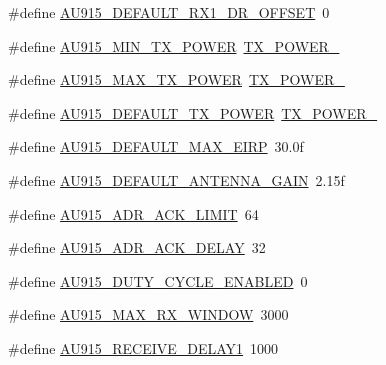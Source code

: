 \begin{DoxyCompactItemize}
\item 
\#define \mbox{\hyperlink{group___r_e_g_i_o_n_a_u915_gad91be65b45ba7c349d42b1e564c65251}{A\+U915\+\_\+\+D\+E\+F\+A\+U\+L\+T\+\_\+\+R\+X1\+\_\+\+D\+R\+\_\+\+O\+F\+F\+S\+ET}}~0
\item 
\#define \mbox{\hyperlink{group___r_e_g_i_o_n_a_u915_gabd0f5ea8e2143d42b1e480305bb2fd5d}{A\+U915\+\_\+\+M\+I\+N\+\_\+\+T\+X\+\_\+\+P\+O\+W\+ER}}~\mbox{\hyperlink{group___r_e_g_i_o_n_gac9747c69350f34d485c3134e5a57655b}{T\+X\+\_\+\+P\+O\+W\+E\+R\+\_}}
\item 
\#define \mbox{\hyperlink{group___r_e_g_i_o_n_a_u915_ga36808f695e52582b8a6a3ca4b4bf61d4}{A\+U915\+\_\+\+M\+A\+X\+\_\+\+T\+X\+\_\+\+P\+O\+W\+ER}}~\mbox{\hyperlink{group___r_e_g_i_o_n_gab33618449f2a573142c463ab071ef8ed}{T\+X\+\_\+\+P\+O\+W\+E\+R\+\_}}
\item 
\#define \mbox{\hyperlink{group___r_e_g_i_o_n_a_u915_ga8f8d247b742aea5399eabca9b978121f}{A\+U915\+\_\+\+D\+E\+F\+A\+U\+L\+T\+\_\+\+T\+X\+\_\+\+P\+O\+W\+ER}}~\mbox{\hyperlink{group___r_e_g_i_o_n_gab33618449f2a573142c463ab071ef8ed}{T\+X\+\_\+\+P\+O\+W\+E\+R\+\_}}
\item 
\#define \mbox{\hyperlink{group___r_e_g_i_o_n_a_u915_gac1d0807c3b28e1f1e1c7f574e66ba158}{A\+U915\+\_\+\+D\+E\+F\+A\+U\+L\+T\+\_\+\+M\+A\+X\+\_\+\+E\+I\+RP}}~30.\+0f
\item 
\#define \mbox{\hyperlink{group___r_e_g_i_o_n_a_u915_ga3184a1e4e099ac04b86c390a012845a7}{A\+U915\+\_\+\+D\+E\+F\+A\+U\+L\+T\+\_\+\+A\+N\+T\+E\+N\+N\+A\+\_\+\+G\+A\+IN}}~2.\+15f
\item 
\#define \mbox{\hyperlink{group___r_e_g_i_o_n_a_u915_gab5782862067a1d6338da8372a9d484c6}{A\+U915\+\_\+\+A\+D\+R\+\_\+\+A\+C\+K\+\_\+\+L\+I\+M\+IT}}~64
\item 
\#define \mbox{\hyperlink{group___r_e_g_i_o_n_a_u915_ga6c2174a6e83dcd5e4137a28c841d82b2}{A\+U915\+\_\+\+A\+D\+R\+\_\+\+A\+C\+K\+\_\+\+D\+E\+L\+AY}}~32
\item 
\#define \mbox{\hyperlink{group___r_e_g_i_o_n_a_u915_gad79bd0bbe937761936fef981e384d398}{A\+U915\+\_\+\+D\+U\+T\+Y\+\_\+\+C\+Y\+C\+L\+E\+\_\+\+E\+N\+A\+B\+L\+ED}}~0
\item 
\#define \mbox{\hyperlink{group___r_e_g_i_o_n_a_u915_gaa6e565b2bc461699f7119256776b8f67}{A\+U915\+\_\+\+M\+A\+X\+\_\+\+R\+X\+\_\+\+W\+I\+N\+D\+OW}}~3000
\item 
\#define \mbox{\hyperlink{group___r_e_g_i_o_n_a_u915_ga989f85b36be98caed732595e6b13adb3}{A\+U915\+\_\+\+R\+E\+C\+E\+I\+V\+E\+\_\+\+D\+E\+L\+A\+Y1}}~1000
\item 

\end{DoxyCompactItemize}
